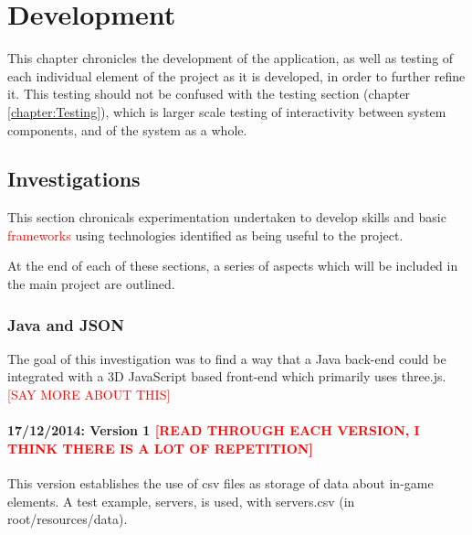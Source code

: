 \def\baselinestretch{1}

\chapter{Development}
\label{chapter:Development}

\def\baselinestretch{1.66}



This chapter chronicles the development of the application, as well as testing of each individual element of the project as it is developed, in order to further refine it. This testing should not be confused with the testing section (chapter \ref{chapter:Testing}), which is larger scale testing of interactivity between system components, and of the system as a whole.

\goodbreak

\section{Investigations}
\label{sec:Investigations}
This section chronicals experimentation undertaken to develop skills and basic \textcolor{red}{frameworks} using technologies identified as being useful to the project.

At the end of each of these sections, a series of aspects which will be included in the main project are outlined.

\subsection{Java and JSON}
\label{subSec:Java and JSON}
The goal of this investigation was to find a way that a Java back-end could be integrated with a 3D JavaScript based front-end which primarily uses three.js. \textcolor{red}{[SAY MORE ABOUT THIS]}

\subsubsection{17/12/2014: Version 1 \textcolor{red}{[READ THROUGH EACH VERSION, I THINK THERE IS A LOT OF REPETITION]}}
\label{subSubSection:Java and JSON: Lab 1}
This version establishes the use of csv files as storage of data about in-game elements. A test example, servers, is used, with servers.csv (in root/resources/data).

